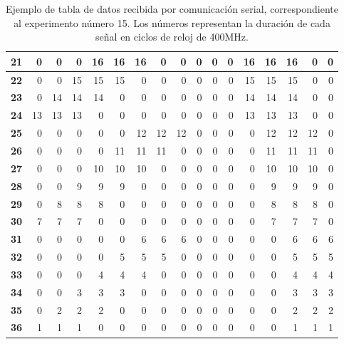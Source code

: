 \begin{table}[ht]
{\begin{tabular}{|l|r|r|r|r|r|r|r|r|r|r|r|r|r|r|r|r|}
				\textbf{21} & 0  & 0  & 0  & 16 & 16 & 16 & 0  & 0  & 0  & 0  & 0  & 16 & 16 & 16 & 0  & 0 \\ \hline
				\rowcolor[HTML]{FFFFFF} 
				\textbf{22} & 0  & 0  & 15 & 15 & 15 & 0  & 0  & 0  & 0  & 0  & 0  & 15 & 15 & 15 & 0  & 0 \\ \hline
				\rowcolor[HTML]{E2EFDA} 
				\textbf{23} & 0  & 14 & 14 & 14 & 0  & 0  & 0  & 0  & 0  & 0  & 0  & 14 & 14 & 14 & 0  & 0 \\ \hline
				\rowcolor[HTML]{FFFFFF} 
				\textbf{24} & 13 & 13 & 13 & 0  & 0  & 0  & 0  & 0  & 0  & 0  & 0  & 13 & 13 & 13 & 0  & 0 \\ \hline
				\rowcolor[HTML]{E2EFDA} 
				\textbf{25} & 0  & 0  & 0  & 0  & 0  & 12 & 12 & 12 & 0  & 0  & 0  & 0  & 12 & 12 & 12 & 0 \\ \hline
				\rowcolor[HTML]{FFFFFF} 
				\textbf{26} & 0  & 0  & 0  & 0  & 11 & 11 & 11 & 0  & 0  & 0  & 0  & 0  & 11 & 11 & 11 & 0 \\ \hline
				\rowcolor[HTML]{E2EFDA} 
				\textbf{27} & 0  & 0  & 0  & 10 & 10 & 10 & 0  & 0  & 0  & 0  & 0  & 0  & 10 & 10 & 10 & 0 \\ \hline
				\rowcolor[HTML]{FFFFFF} 
				\textbf{28} & 0  & 0  & 9  & 9  & 9  & 0  & 0  & 0  & 0  & 0  & 0  & 0  & 9  & 9  & 9  & 0 \\ \hline
				\rowcolor[HTML]{E2EFDA} 
				\textbf{29} & 0  & 8  & 8  & 8  & 0  & 0  & 0  & 0  & 0  & 0  & 0  & 0  & 8  & 8  & 8  & 0 \\ \hline
				\rowcolor[HTML]{FFFFFF} 
				\textbf{30} & 7  & 7  & 7  & 0  & 0  & 0  & 0  & 0  & 0  & 0  & 0  & 0  & 7  & 7  & 7  & 0 \\ \hline
				\rowcolor[HTML]{E2EFDA} 
				\textbf{31} & 0  & 0  & 0  & 0  & 0  & 6  & 6  & 6  & 0  & 0  & 0  & 0  & 0  & 6  & 6  & 6 \\ \hline
				\rowcolor[HTML]{FFFFFF} 
				\textbf{32} & 0  & 0  & 0  & 0  & 5  & 5  & 5  & 0  & 0  & 0  & 0  & 0  & 0  & 5  & 5  & 5 \\ \hline
				\rowcolor[HTML]{E2EFDA} 
				\textbf{33} & 0  & 0  & 0  & 4  & 4  & 4  & 0  & 0  & 0  & 0  & 0  & 0  & 0  & 4  & 4  & 4 \\ \hline
				\rowcolor[HTML]{FFFFFF} 
				\textbf{34} & 0  & 0  & 3  & 3  & 3  & 0  & 0  & 0  & 0  & 0  & 0  & 0  & 0  & 3  & 3  & 3 \\ \hline
				\rowcolor[HTML]{E2EFDA} 
				\textbf{35} & 0  & 2  & 2  & 2  & 0  & 0  & 0  & 0  & 0  & 0  & 0  & 0  & 0  & 2  & 2  & 2 \\ \hline
				\rowcolor[HTML]{FFFFFF} 
				\textbf{36} & 1  & 1  & 1  & 0  & 0  & 0  & 0  & 0  & 0  & 0  & 0  & 0  & 0  & 1  & 1  & 1 \\ \hline
			\end{tabular}%
		}
		\caption{Ejemplo de tabla de datos recibida por comunicación serial, correspondiente al experimento número 15. Los números representan la duración de cada señal en ciclos de reloj de 400MHz.}
		\label{tab:datos-serial}
	\end{table}
